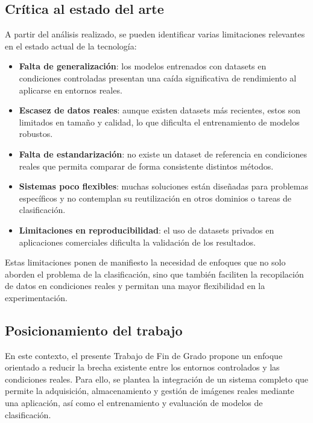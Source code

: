 \documentclass[12pt,a4paper]{article}
\begin{document}
\subsection{Crítica al estado del arte}

A partir del análisis realizado, se pueden identificar varias limitaciones relevantes en el estado actual de la tecnología:

\begin{itemize}
    \item \textbf{Falta de generalización}: los modelos entrenados con datasets en condiciones controladas presentan una caída significativa de rendimiento al aplicarse en entornos reales.
    
    \item \textbf{Escasez de datos reales}: aunque existen datasets más recientes, estos son limitados en tamaño y calidad, lo que dificulta el entrenamiento de modelos robustos.
    
    \item \textbf{Falta de estandarización}: no existe un dataset de referencia en condiciones reales que permita comparar de forma consistente distintos métodos.
    
    \item \textbf{Sistemas poco flexibles}: muchas soluciones están diseñadas para problemas específicos y no contemplan su reutilización en otros dominios o tareas de clasificación.
    
    \item \textbf{Limitaciones en reproducibilidad}: el uso de datasets privados en aplicaciones comerciales dificulta la validación de los resultados.
\end{itemize}

Estas limitaciones ponen de manifiesto la necesidad de enfoques que no solo aborden el problema de la clasificación, sino que también faciliten la recopilación de datos en condiciones reales y permitan una mayor flexibilidad en la experimentación.

\subsection{Posicionamiento del trabajo}

En este contexto, el presente Trabajo de Fin de Grado propone un enfoque orientado a reducir la brecha existente entre los entornos controlados y las condiciones reales. Para ello, se plantea la integración de un sistema completo que permite la adquisición, almacenamiento y gestión de imágenes reales mediante una aplicación, así como el entrenamiento y evaluación de modelos de clasificación.
\end{document}
